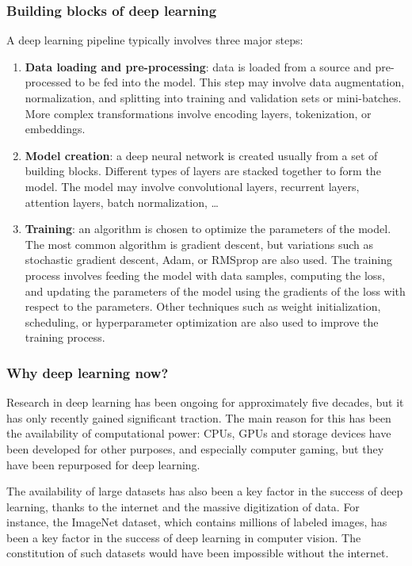 \subsubsection{Building blocks of deep learning}
A deep learning pipeline typically involves three major steps:
\begin{enumerate}
    \item \textbf{Data loading and pre-processing}: data is loaded from a source and pre-processed to be fed into the model. This step may involve data augmentation, normalization, and splitting into training and validation sets or mini-batches. More complex transformations involve encoding layers, tokenization, or embeddings.
    \item \textbf{Model creation}: a deep neural network is created usually from a set of building blocks. Different types of layers are stacked together to form the model. The model may involve convolutional layers, recurrent layers, attention layers, batch normalization, \dots
    \item \textbf{Training}: an algorithm is chosen to optimize the parameters of the model. The most common algorithm is gradient descent, but variations such as stochastic gradient descent, Adam, or RMSprop are also used. The training process involves feeding the model with data samples, computing the loss, and updating the parameters of the model using the gradients of the loss with respect to the parameters. Other techniques such as weight initialization, scheduling, or hyperparameter optimization are also used to improve the training process.
\end{enumerate}

\subsubsection{Why deep learning now?}
Research in deep learning has been ongoing for approximately five decades, but it has only recently gained significant traction. The main reason for this has been the availability of computational power: CPUs, GPUs and storage devices have been developed for other purposes, and especially computer gaming, but they have been repurposed for deep learning. 

The availability of large datasets has also been a key factor in the success of deep learning, thanks to the internet and the massive digitization of data. For instance, the ImageNet dataset, which contains millions of labeled images, has been a key factor in the success of deep learning in computer vision. The constitution of such datasets would have been impossible without the internet.


